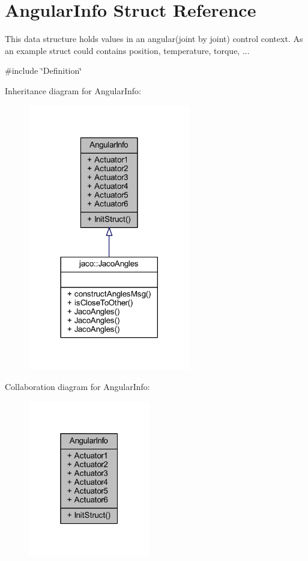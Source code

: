 \hypertarget{structAngularInfo}{}\section{Angular\+Info Struct Reference}
\label{structAngularInfo}


This data structure holds values in an angular(joint by joint) control context. As an example struct could contains position, temperature, torque, ...  




{\ttfamily \#include \char`\"{}Definition\char`\"{}}



Inheritance diagram for Angular\+Info\+:
\nopagebreak
\begin{figure}[H]
\begin{center}
\leavevmode
\includegraphics[width=201pt]{d4/d78/structAngularInfo__inherit__graph}
\end{center}
\end{figure}


Collaboration diagram for Angular\+Info\+:
\nopagebreak
\begin{figure}[H]
\begin{center}
\leavevmode
\includegraphics[width=151pt]{d3/db8/structAngularInfo__coll__graph}
\end{center}
\end{figure}
